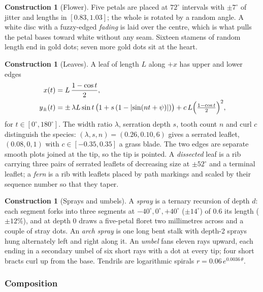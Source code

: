 \documentclass[11pt,a4paper]{article}
\theoremstyle{plain}
\theoremstyle{definition}
\newtheorem{construction}[proposition]{Construction}
\begin{document}
\begin{construction}[Flower]
Five petals are placed at $72^\circ$ intervals with $\pm7^\circ$ of jitter and lengths in
$[0.83,1.03]$; the whole is rotated by a random angle. A white disc with a fuzzy-edged
\emph{fading} is laid over the centre, which is what pulls the petal bases toward white
without any seam. Sixteen stamens of random length end in gold dots; seven more gold
dots sit at the heart.
\end{construction}

\begin{construction}[Leaves]
A leaf of length $L$ along $+x$ has upper and lower edges
\begin{align*}
  x(t)&=L\,\frac{1-\cos t}{2},\\
  y_\pm(t)&=\pm\,\lambda L\sin t\,\bigl(1+s\,(1-\lvert\sin(n t+\psi)\rvert)\bigr)
           +c\,L\Bigl(\tfrac{1-\cos t}{2}\Bigr)^{2},
\end{align*}
for $t\in[0^\circ,180^\circ]$. The width ratio $\lambda$, serration depth $s$, tooth count
$n$ and curl $c$ distinguish the species: $(\lambda,s,n)=(0.26,0.10,6)$ gives a serrated
leaflet, $(0.08,0,1)$ with $c\in[-0.35,0.35]$ a grass blade. The two edges are separate
smooth plots joined at the tip, so the tip is pointed. A \emph{dissected} leaf is a rib
carrying three pairs of serrated leaflets of decreasing size at $\pm52^\circ$ and a terminal
leaflet; a \emph{fern} is a rib with leaflets placed by path markings and scaled by their
sequence number so that they taper.
\end{construction}

\begin{construction}[Sprays and umbels]
A \emph{spray} is a ternary recursion of depth $d$: each segment forks into three
segments at $-40^\circ,0^\circ,+40^\circ$ ($\pm14^\circ$) of $0.6$ its length ($\pm12\%$),
and at depth $0$ draws a five-petal floret two millimetres across and a couple of stray
dots. An \emph{arch spray} is one long bent stalk with depth-2 sprays hung alternately
left and right along it. An \emph{umbel} fans eleven rays upward, each ending in a
secondary umbel of six short rays with a dot at every tip; four short bracts curl up from
the base. Tendrils are logarithmic spirals $r=0.06\,e^{0.0036\,\theta}$.
\end{construction}

\subsubsection{Composition}
\end{document}
